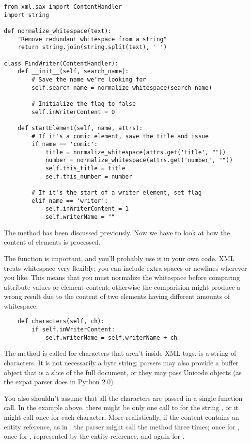 \documentclass{howto}
\begin{document}
\begin{verbatim}
from xml.sax import ContentHandler
import string

def normalize_whitespace(text):
    "Remove redundant whitespace from a string"
    return string.join(string.split(text), ' ')

class FindWriter(ContentHandler):
    def __init__(self, search_name):
        # Save the name we're looking for
        self.search_name = normalize_whitespace(search_name)

        # Initialize the flag to false
        self.inWriterContent = 0

    def startElement(self, name, attrs):
        # If it's a comic element, save the title and issue
        if name == 'comic':
            title = normalize_whitespace(attrs.get('title', ""))
            number = normalize_whitespace(attrs.get('number', ""))
            self.this_title = title
            self.this_number = number

        # If it's the start of a writer element, set flag
        elif name == 'writer':
            self.inWriterContent = 1
            self.writerName = ""
\end{verbatim}

The  method has been discussed previously.  Now
we have to look at how the content of elements is processed.  

The  function is important, and
you'll probably use it in your own code.  XML treats whitespace very
flexibly; you can include extra spaces or newlines wherever you like.
This means that you must normalize the whitespace before comparing
attribute values or element content; otherwise the comparision might
produce a wrong result due to the content of two elements having
different amounts of whitespace.

\begin{verbatim}
    def characters(self, ch):
        if self.inWriterContent:
            self.writerName = self.writerName + ch
\end{verbatim}

The  method is called for characters that aren't
inside XML tags.   is a string of characters. It is not
necessarily a byte string; parsers may also provide a buffer object
that is a slice of the full document, or they may pass Unicode
objects (as the expat parser does in Python 2.0).

You also shouldn't assume that all the characters are passed in a
single function call.  In the example above, there might be only one
call to  for the string , or
it might call  once for each character.  More
realistically, if the content contains an entity reference, as in
, the parser might call the method three times; once for 
, once for \samp{\&}, represented by the entity
reference, and again for .
\end{document}
